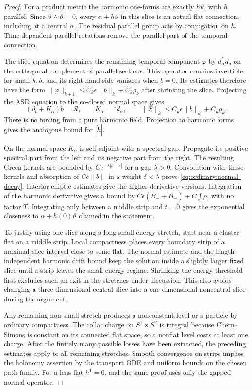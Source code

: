 \begin{proof}
For a product metric the harmonic one-forms are exactly
$h\vartheta$, with $h$ parallel.  Since
$\vartheta\wedge\vartheta=0$, every $\alpha+h\vartheta$ in this
slice is an actual flat connection, including at a central
$\alpha$.  The residual parallel group acts by conjugation on
$h$.  Time-dependent parallel rotations remove the parallel part
of the temporal connection.

The slice equation determines the remaining temporal component
$\varphi$ by $d_\alpha^*d_a$ on the orthogonal complement of
parallel sections.  This operator remains invertible for small
$h,b$, and its right-hand side vanishes when $b=0$.  Its estimates
therefore have the form
$\|\varphi\|_{k+1}\le C_k\epsilon\|b\|_k+C_k\rho_k$ after
shrinking the slice.  Projecting the ASD equation to the
co-closed normal space gives
\[
 (\partial_t+K_\alpha)b=\mathcal R,
 \qquad K_\alpha=*d_\alpha,
 \qquad
 \|\mathcal R\|_k\le C_k\epsilon\|b\|_k+C_k\rho_k.
\]
There is no forcing from a pure harmonic field.  Projection to
harmonic forms gives the analogous bound for $|\dot h|$.

On the normal space $K_\alpha$ is self-adjoint with a spectral
gap.  Propagate its positive spectral part from the left and its
negative part from the right.  The resulting Green kernels are
bounded by $Ce^{-\lambda|t-s|}$ for a gap $\lambda>0$.
Convolution with these kernels and absorption of
$C\epsilon\|b\|$ in a weight $\delta<\lambda$ prove
\eqref{eq:ordinary:normal-decay}.  Interior elliptic estimates
give the higher derivative versions.  Integration of the
harmonic derivative gives a bound by
$C\epsilon(B_-+B_+)+C\int\rho$, with no factor $T$.
Integrating only between a middle strip and $t=0$ gives the
exponential closeness to $\alpha+h(0)\vartheta$ claimed in the
statement.

To justify using one slice along a long small-energy stretch,
start near a cluster flat on a middle strip.  Local compactness
places every boundary strip of a maximal slice interval close
to some flat.  The normal estimate and the length-independent
harmonic drift bound keep the solution inside a slightly larger
fixed slice until a strip leaves the small-energy regime.
Shrinking the energy threshold first excludes such an exit in
the stretches under discussion.  This also avoids changing a
three-dimensional central slice into a one-dimensional
noncentral slice during the argument.

Any remaining non-small stretch produces a nonconstant level
or a particle by ordinary compactness.  The collar charge on
$S^1\times S^2$ is integral because Chern--Simons is constant
on its connected flat space, so a nonflat level costs at least
one charge.  After the finitely many possible losses have been
extracted, the preceding estimates apply to all remaining
stretches.  Smooth convergence on strips implies the holonomy
assertion by the transport ODE and uniform bounds on the
chosen path family.  For a lens flat $h^1=0$, and the same
proof uses only the gapped normal operator.
\end{proof}

